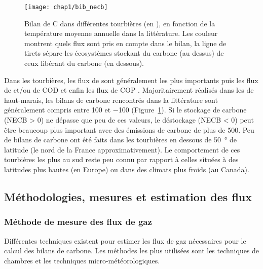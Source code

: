 \begin{figure}
\centering
\texttt{[image: chap1/bib\_necb]}
\caption{Bilan de C dans différentes tourbières (en \si{\gcma}), en fonction de la température moyenne annuelle dans la littérature. Les couleur montrent quels flux sont pris en compte dans le bilan, la ligne de tirets sépare les écosystèmes stockant du carbone (au dessus) de ceux libérant du carbone (en dessous).}
\label{fig:bib_necb}
\end{figure}


Dans les tourbières, les flux de \coo sont généralement les plus importants puis les flux de \chh et/ou de COD et enfin les flux de COP \citep{worrall2009,koehler2011}.
Majoritairement réalisés dans les de haut-marais, les bilans de carbone rencontrés dans la littérature sont généralement compris entre 100 et \SI{-100}{\gcma} (Figure~\ref{fig:bib_necb}).
Si le stockage de carbone (NECB > 0) ne dépasse que peu de ces valeurs, le déstockage (NECB < 0) peut être beaucoup plus important avec des émissions de carbone de plus de \SI{500}{\gcma}.
Peu de bilans de carbone ont été faits dans les tourbières en dessous de \SI{50}{\degree} de latitude (le nord de la France approximativement).
Le comportement de ces tourbières les plus au sud reste peu connu par rapport à celles situées à des latitudes plus hautes (en Europe) ou dans des climats plus froids (au Canada).

\subsection{Méthodologies, mesures et estimation des flux}

\subsubsection{Méthode de mesure des flux de gaz}

Différentes techniques existent pour estimer les flux de gaz nécessaires pour le calcul des bilans de carbone.
Les méthodes les plus utilisées sont les techniques de chambres et les techniques micro-météorologiques.

